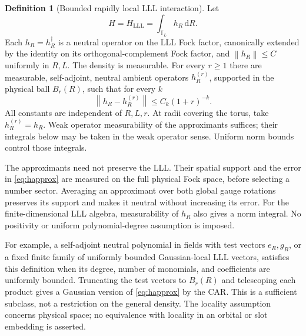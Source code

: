 \documentclass[11pt]{article}
\theoremstyle{definition}
\newtheorem{definition}[theorem]{Definition}
\theoremstyle{remark}
\newcommand{\dd}{\,\mathrm d}
\newcommand{\TT}{\mathbb T}
\newcommand{\norm}[1]{\left\lVert#1\right\rVert}
\begin{document}
\begin{definition}[Bounded rapidly local LLL interaction]\label{def:local}
Let
\[
 H=H_{\mathrm{LLL}}=\int_{\TT_L}h_R\dd R.
\]
Each \(h_R=h_R^\dagger\) is a neutral operator on the LLL Fock
factor, canonically extended by the identity on its orthogonal-complement
Fock factor, and \(\norm{h_R}\le C\) uniformly in \(R,L\).
The density is measurable.  For every \(r\ge1\) there are measurable,
self-adjoint, neutral ambient operators \(h_R^{(r)}\), supported
in the physical ball \(B_r(R)\), such that for every \(k\)
\begin{equation}\label{eq:happrox}
 \norm{h_R-h_R^{(r)}}\le C_k(1+r)^{-k}.
\end{equation}
All constants are independent of \(R,L,r\).  At radii covering
the torus, take \(h_R^{(r)}=h_R\).  Weak operator measurability
of the approximants suffices; their integrals below may be taken
in the weak operator sense.  Uniform norm bounds control those integrals.
\end{definition}

The approximants need not preserve the LLL.  Their spatial support
and the error in \eqref{eq:happrox} are measured on the full physical
Fock space, before selecting a number sector.  Averaging an approximant
over both global gauge rotations preserves its support and makes it
neutral without increasing its error.  For the finite-dimensional LLL
algebra, measurability of \(h_R\) also gives a norm integral.
No positivity or uniform polynomial-degree assumption is imposed.

For example, a self-adjoint neutral polynomial in fields with test
vectors \(e_R,g_R\), or a fixed finite family of uniformly bounded
Gaussian-local LLL vectors, satisfies this definition when its degree,
number of monomials, and coefficients are uniformly bounded.
Truncating the test vectors to \(B_r(R)\) and telescoping each
product gives a Gaussian version of \eqref{eq:happrox} by the CAR.
This is a sufficient subclass, not a restriction on the general density.
The locality assumption concerns physical space; no equivalence with
locality in an orbital or slot embedding is asserted.
\end{document}
